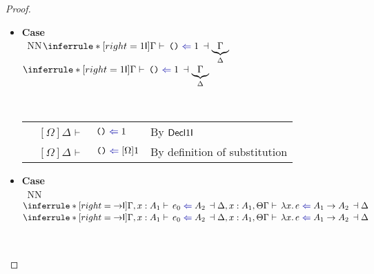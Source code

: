 \documentclass[a4paper]{article}
\makeatletter
\newcommand{\mathcolor}[2]{\text{\textcolor{#1}{\ensuremath{#2}}}}
\newcommand{\arr}{\rightarrow}
\def\CompactJudgments{0}
\newcommand{\entails}{\mathrel{\ifnum\CompactJudgments=1\vdash \else \vdash\,\fi}}
\newcommand{\ctxoutsym}{\ifnum\CompactJudgments=1\dashv \else \,\dashv \fi}
\newcommand{\ctxout}[1]{\mathrel{\ctxoutsym}{#1}}
\newcommand{\tyname}[1]{\textsf{\normalfont #1}}
\newcommand{\unitexp}{\text{\normalfont \tt()}}
\newcommand{\unitty}{\tyname{1}}
\newcommand{\Lemmaref}[1]{Lemma \ref{#1} (\nameref{#1})}   \newcommand{\Lemref}[1]{\Lemma \ref{#1}}   \newcommand{\Conjectureref}[1]{Conjecture \ref{#1}}
\gdef\xxDerivationProofCaseColor{N}
\newcommand{\DerivationProofCase}[3]{\smallskip
     \item \parbox[t]{100ex}{\textbf{Case } \\[-0.5em]
       $~$\hspace{5ex}
       \if\xxDerivationProofCaseColor N\ensuremath{\Infer{#1}{#2}{#3}}
       \else \colorbox{\xxDerivationProofCaseColor}{\ensuremath{\Infer{#1}{#2}{#3}}}\fi }\nopagebreak \\[-0.8ex]
  }
\newcommand{\BeginProof}{\renewcommand{\arraystretch}{1.1} \begin{tabular}[b]{r@{}r @{} l  l}}
\newcommand{\EndProof}{\end{tabular} \renewcommand{\arraystretch}{\mydefaultarraystretch}}
\newcommand{\Hand}{\text{\Pointinghand~~~~}}
\newcommand{\Pf}[4] {&$#1$ $#2$\, & $#3$ & #4 \\}
\newcommand{\Pfmrg}[3] {&$#1$\, & $#2$ & #3 \\}
\newcommand{\mkpf}[4] {\Pf{#2}{#1\,}{#3}{#4}}
\newcommand{\eqPf}[3] {\mkpf{=}{#1}{#2}{#3}}
\newcommand{\proofsep}{\,\\[-0.5em]}
\newenvironment{llproof}{\BeginProof}{\EndProof}
\newcommand{\Infer}[3]{\inferrule*[right={\text{\strut#1}}]{{}#2\mathstrut}{{}#3\mathstrut}}
\newcommand{\lam}[1]{\lambda #1.\,}
\newcommand{\substextendPf}[3] {\Pfmrg{{#1} \extendssym\,}{#2}{#3}}
\newcommand{\chkcolor}{dBlue}
\newcommand{\syncolor}{dRed}
\newcommand{\chk}{\mathrel{\mathcolor{\chkcolor}{\Leftarrow}}}
\newcommand{\uncoloredsyn}{{\Rightarrow}}
\newcommand{\syn}{\mathrel{\mathcolor{\syncolor}{\uncoloredsyn}}}
\newcommand{\chkjudg}[4]{\ensuremath{{#1} \entails {#2} \chk {#3} \ctxout{#4}}}
\newcommand{\chkjudgPf}[5]{\Pf{#1}{\entails}{{#2} \chk {#3} \ctxout{#4}}{#5}}
\newcommand{\declchkjudgPf}[4]{\Pf{#1}{\entails}{{#2} \chk {#3}}{#4}}
\newcommand{\declsynjudgPf}[4]{\Pf{#1}{\entails}{{#2} \syn {#3}}{#4}}
\newcommand{\extendssym}{\longrightarrow}
\newcommand{\judgetpPf}[3]{\Pf{#1}{\entails}{#2}{#3}}
\newcommand{\rulename}[1]{\text{\normalfont\textsf{#1}}}
\newcommand{\Decltyrulename}[1]{\ensuremath{\rulename{Decl#1}}\xspace}
\newcommand{\DeclIntrorulename}[1]{\Decltyrulename{\ensuremath{#1}I}}
\newcommand{\DeclAnno}{\Decltyrulename{Anno}}
\newcommand{\DeclUnitIntro}{\DeclIntrorulename{\unitty}}
\newcommand{\Tyrulename}[1]{\ensuremath{\rulename{#1}}\xspace}
\newcommand{\Introrulename}[1]{\Tyrulename{\ensuremath{#1}I}}
\newcommand{\UnitIntro}{\Introrulename{\unitty}}
\newcommand{\ArrIntro}{\Introrulename{\arr}}
\makeatother
\begin{document}
\begin{proof}
\begin{itemize}
          \begin{llproof}
            \chkjudgPf{\Gamma}{e_0}{A}{\Delta}  {Subderivation}
            \declchkjudgPf{[\Omega]\Delta} {e_0} {[\Omega]A}  {By i.h.}
            \proofsep
            \judgetpPf{\Gamma}{A}  {Subderivation}
            \substextendPf{\Gamma}{\Delta}  {By \Lemmaref{lem:typing-extension}}
            \substextendPf{\Delta}{\Omega}  {Given}
            \substextendPf{\Gamma}{\Omega}  {By \Lemmaref{lem:substextend-transitivity}}
            \judgetpPf{\Omega} {A}   {By \Lemmaref{lem:extension-weakening}}
            \judgetpPf{[\Omega]\Omega} {[\Omega]A}   {By \Lemmaref{lem:completion-wf}}
            \eqPf{[\Omega]\Delta}{[\Omega]\Omega}  {By \Lemmaref{lem:completes-stability}}
            \judgetpPf{[\Omega]\Delta} {[\Omega]A}   {By above equality}
            \proofsep
            \declsynjudgPf{[\Omega]\Delta} {(e_0 : [\Omega]A)} {[\Omega]A}  {By \DeclAnno}
            \Pf{}{}{A\text{~contains no existential variables}}   {Assumption about source programs}
            \eqPf{[\Omega]A} {A}  {From definition of substitution}
\Hand     \declsynjudgPf{[\Omega]\Delta} {(e_0 : A)} {[\Omega]A}  {By above equality}
          \end{llproof}

     \DerivationProofCase{\UnitIntro}
          {}
          {\chkjudg{\Gamma}{\unitexp}{\unitty}{\underbrace{\Gamma}_{\Delta}}}

          \begin{llproof}
            \declchkjudgPf{[\Omega]\Delta}{\unitexp}{\unitty}   {By \DeclUnitIntro}
\Hand    \declchkjudgPf{[\Omega]\Delta} {\unitexp} {[\Omega]\unitty}  {By definition of substitution}
          \end{llproof}

     \DerivationProofCase{\ArrIntro}
          {\chkjudg{\Gamma, x : A_1}{e_0}{A_2}{\Delta, x : A_1, \Theta}
          }
          {\chkjudg{\Gamma}{\lam{x} e}{A_1 \arr A_2}{\Delta}}


\end{itemize}
\end{proof}
\end{document}
